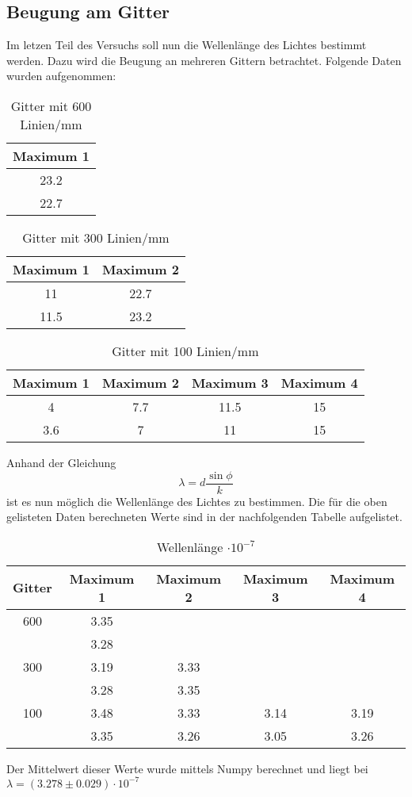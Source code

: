 \subsection{Beugung am Gitter}
  Im letzen Teil des Versuchs soll nun die Wellenlänge des Lichtes bestimmt werden. Dazu 
  wird die Beugung an mehreren Gittern betrachtet. Folgende Daten wurden aufgenommen:
  \begin{table}[H]
    \centering
    \caption{Gitter mit 600 Linien/mm}
    \begin{tabular}{c}
      \toprule
      Maximum 1\\
      \midrule
      23.2 \\
      22.7 \\
      \bottomrule
    \end{tabular}
  \end{table}
  \begin{table}[H]
    \centering
    \caption{Gitter mit 300 Linien/mm}
    \begin{tabular}{c c}
      \toprule
      Maximum 1 & Maximum 2\\
      \midrule
      11   & 22.7 \\
      11.5 & 23.2 \\
      \bottomrule
    \end{tabular}
  \end{table}
  \begin{table}[H]
    \centering
    \caption{Gitter mit 100 Linien/mm}
    \begin{tabular}{c c c c}
      \toprule
      Maximum 1 & Maximum 2 & Maximum 3 & Maximum 4\\
      \midrule
      4   & 7.7 & 11.5 & 15 \\
      3.6 & 7   & 11   & 15 \\
      \bottomrule
    \end{tabular}
  \end{table}
  \noindent Anhand der Gleichung 
  \begin{equation*}
    \lambda = d \dfrac{\sin{\phi}}{k}
  \end{equation*}
  ist es nun möglich die Wellenlänge des Lichtes zu bestimmen. Die für die oben 
  gelisteten Daten berechneten Werte sind in der nachfolgenden Tabelle aufgelistet.
  \begin{table}[H]
    \centering
    \caption{Wellenlänge $\cdot 10^{-7}$}
    \begin{tabular}{c c c c c}
      \toprule
      Gitter & Maximum 1 & Maximum 2 & Maximum 3 & Maximum 4\\
      \midrule
      600&3.35   &&&\\
      &3.28&&&\\
      300&3.19& 3.33&& \\
      &3.28&3.35&&\\
      100&  3.48   &   3.33&  3.14&3.19 \\
      &3.35&3.26&3.05&3.26\\
      \bottomrule
    \end{tabular}
  \end{table}
  \noindent Der Mittelwert dieser Werte wurde mittels Numpy berechnet und liegt bei 
  $\lambda=(3.278\pm0.029)\cdot 10^{-7}$